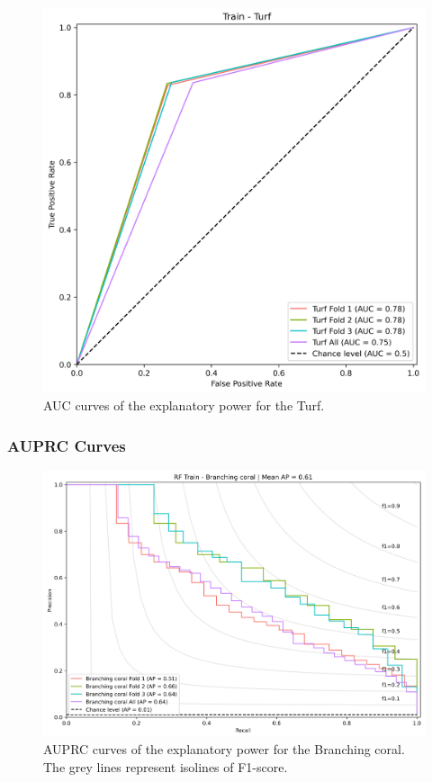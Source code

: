 \begin{figure}
\hypertarget{fig:chap3figS21}{%
\centering
\includegraphics{03-Chapitre3/figures/supplementary/03-receiver_operator_curve_train_rf_Turf.png}
\caption{AUC curves of the explanatory power for the
Turf.}\label{fig:chap3figS21}
}
\end{figure}

\hypertarget{auprc-curves}{%
\subsubsection*{AUPRC Curves}\label{auprc-curves}}

\begin{figure}
\hypertarget{fig:chap3figS22}{%
\centering
\includegraphics{03-Chapitre3/figures/supplementary/03-precision_recall_curve_train_rf_Branching coral.png}
\caption{AUPRC curves of the explanatory power for the Branching coral.
The grey lines represent isolines of F1-score.}\label{fig:chap3figS22}
}
\end{figure}

